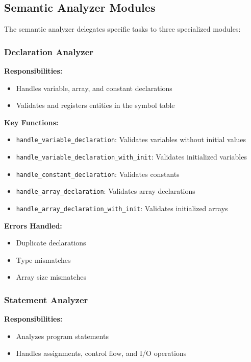 \documentclass[12pt,a4paper]{article}
\begin{document}
\subsection{Semantic Analyzer Modules}

The semantic analyzer delegates specific tasks to three specialized modules:

\subsubsection{Declaration Analyzer}

\textbf{Responsibilities:}
\begin{itemize}
	\item Handles variable, array, and constant declarations
	\item Validates and registers entities in the symbol table
\end{itemize}

\textbf{Key Functions:}
\begin{itemize}
	\item \texttt{handle\_variable\_declaration}: Validates variables without initial values
	\item \texttt{handle\_variable\_declaration\_with\_init}: Validates initialized variables
	\item \texttt{handle\_constant\_declaration}: Validates constants
	\item \texttt{handle\_array\_declaration}: Validates array declarations
	\item \texttt{handle\_array\_declaration\_with\_init}: Validates initialized arrays
\end{itemize}

\textbf{Errors Handled:}
\begin{itemize}
	\item Duplicate declarations
	\item Type mismatches
	\item Array size mismatches
\end{itemize}

\subsubsection{Statement Analyzer}

\textbf{Responsibilities:}
\begin{itemize}
	\item Analyzes program statements
	\item Handles assignments, control flow, and I/O operations
\end{itemize}
\end{document}
